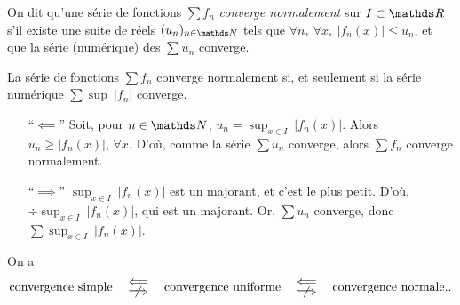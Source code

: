 \begin{defn}
	On dit qu'une série de fonctions $\sum f_n$\/ \textsl{converge normalement} sur $I \subset \R$\/ s'il existe une suite de réels $(u_n)_{n\in\N}$\/ tels que $\forall n,\:\forall x,\:|f_n(x)| \le u_n$, et que la série (numérique) des $\sum u_n$\/ converge.
\end{defn}

\begin{prop}
	La série de fonctions $\sum f_n$\/ converge normalement si, et seulement si la série numérique $\sum\sup\:|f_n|$\/ converge.
\end{prop}

\begin{prv}
	\begin{itemize}
		\item[``$\impliedby$''] Soit, pour $n \in \N$, $u_n = \sup_{x \in I}\:|f_n(x)|$. Alors $u_n \ge |f_n(x)|$, $\forall x$. D'où, comme la série $\sum u_n$\/ converge, alors $\sum f_n$\/ converge normalement.
		\item[``$\implies$''] $\sup_{x \in I}\:|f_n(x)|$\/ est un majorant, et c'est le plus petit. D'où, $÷\sup_{x \in I}\:|f_n(x)|$, qui est un majorant. Or, $\sum u_n$\/ converge, donc $\sum \sup_{x \in I}\:|f_n(x)|$.
	\end{itemize}
\end{prv}

\begin{prop}
	On a \[
		\text{convergence simple}\quad\substack{\\\ds\impliedby\\\ds\centernot{\implies}}\quad\text{convergence uniforme}\quad\substack{\\\ds\impliedby\\\ds\centernot{\implies}}\quad\text{convergence normale}.
	.\]
\end{prop}

